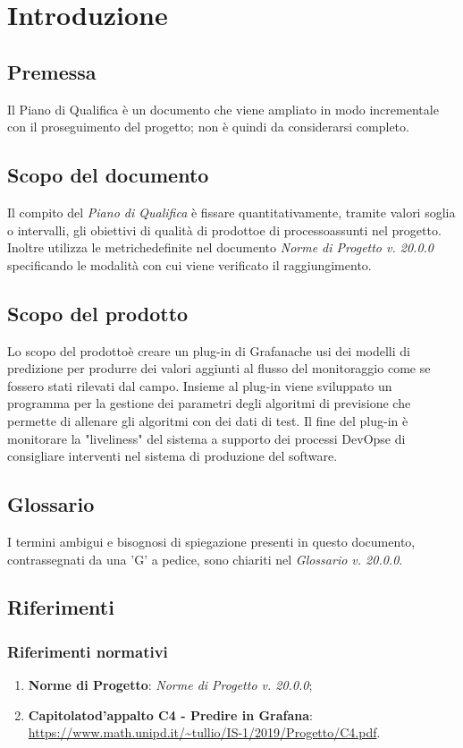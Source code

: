 \section{Introduzione}
	\subsection{Premessa}
	Il Piano di Qualifica è un documento che viene ampliato in modo incrementale con il proseguimento del progetto\glo; non è quindi da considerarsi completo.
	
	\subsection{Scopo del documento}
	Il compito del \textit{Piano di Qualifica} è fissare quantitativamente, tramite valori soglia o intervalli, gli obiettivi di qualità di prodotto\glosp e di processo\glosp assunti nel progetto\glo. Inoltre utilizza le metriche\glosp definite nel documento \textit{Norme di Progetto v. 20.0.0} specificando le modalità con cui viene verificato il raggiungimento.

	\subsection{Scopo del prodotto}
	Lo scopo del prodotto\glosp è creare un plug-in di Grafana\glosp che usi dei modelli di predizione per produrre dei valori aggiunti al flusso del monitoraggio come se fossero stati rilevati dal campo. Insieme al plug-in viene sviluppato un programma per la gestione dei parametri degli algoritmi di previsione che permette di allenare gli algoritmi con dei dati di test. Il fine del plug-in è monitorare la "liveliness" del sistema a supporto dei processi DevOps\glosp e di consigliare interventi nel sistema di produzione del software.
	
	\subsection{Glossario}
	I termini ambigui e bisognosi di spiegazione presenti in questo documento, contrassegnati da una 'G' a pedice, sono chiariti nel \textit{Glossario v. 20.0.0}.
	
	\subsection{Riferimenti}
		\subsubsection{Riferimenti normativi}
		\begin{enumerate}
			\item \textbf{Norme di Progetto}: \textit{Norme di Progetto v. 20.0.0};
			\item \textbf{Capitolato}\glosp \textbf{d'appalto C4 - Predire in Grafana}\glo: \url{https://www.math.unipd.it/~tullio/IS-1/2019/Progetto/C4.pdf}.
		\end{enumerate}
	
